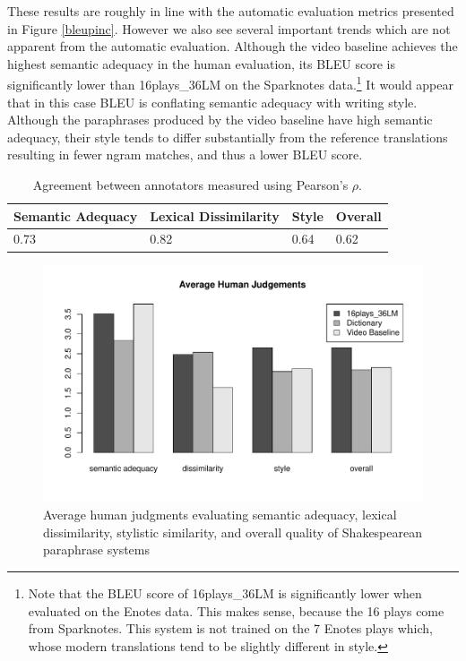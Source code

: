 \documentclass[10pt,a5paper,twoside]{article}
\begin{document}
These results are roughly in line with the automatic evaluation metrics presented in Figure \ref{bleupinc}.  However we also see several important
trends which are not apparent from the automatic evaluation.
Although the video baseline achieves the highest semantic adequacy in the human evaluation, its BLEU score
is significantly lower than 16plays\_36LM on the Sparknotes data.\footnote{
Note that the BLEU score of 16plays\_36LM is significantly lower when evaluated on the Enotes data.  This makes sense, because the 
16 plays come from Sparknotes. This system is not trained on the 7 Enotes plays which, whose modern translations tend
to be slightly different in style.}
It would appear that in this case BLEU is conflating semantic adequacy with writing style.  Although the paraphrases produced 
by the video baseline have high semantic adequacy, their style tends to differ substantially from the reference translations resulting
in fewer ngram matches, and thus a lower BLEU score.

\begin{table}
  \begin{center}
    \begin{tabular}{|l|l|l|l|}
      \hline
      Semantic Adequacy & Lexical Dissimilarity & Style & Overall \\
      \hline
      \hline
      0.73 & 0.82 & 0.64 & 0.62 \\
      \hline
    \end{tabular}
  \end{center}
  \caption{Agreement between annotators measured using Pearson's $\rho$.}
  \label{annotator_agreement}
\end{table}

\begin{figure}[ht]
  \begin{center}
    \includegraphics[width=5in]{figures/human_judgements.pdf}
  \end{center}
  \caption{Average human judgments evaluating semantic adequacy, lexical dissimilarity, stylistic similarity, and overall quality
    of Shakespearean paraphrase systems} 
  \label{human_judgements}
\end{figure}
\end{document}
